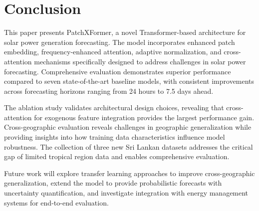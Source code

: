 \documentclass[conference]{IEEEtran}
\begin{document}
\section{Conclusion}

This paper presents PatchXFormer, a novel Transformer-based architecture for solar power generation forecasting. The model incorporates enhanced patch embedding, frequency-enhanced attention, adaptive normalization, and cross-attention mechanisms specifically designed to address challenges in solar power forecasting. Comprehensive evaluation demonstrates superior performance compared to seven state-of-the-art baseline models, with consistent improvements across forecasting horizons ranging from 24 hours to 7.5 days ahead.

The ablation study validates architectural design choices, revealing that cross-attention for exogenous feature integration provides the largest performance gain. Cross-geographic evaluation reveals challenges in geographic generalization while providing insights into how training data characteristics influence model robustness. The collection of three new Sri Lankan datasets addresses the critical gap of limited tropical region data and enables comprehensive evaluation.

Future work will explore transfer learning approaches to improve cross-geographic generalization, extend the model to provide probabilistic forecasts with uncertainty quantification, and investigate integration with energy management systems for end-to-end evaluation.
\end{document}
